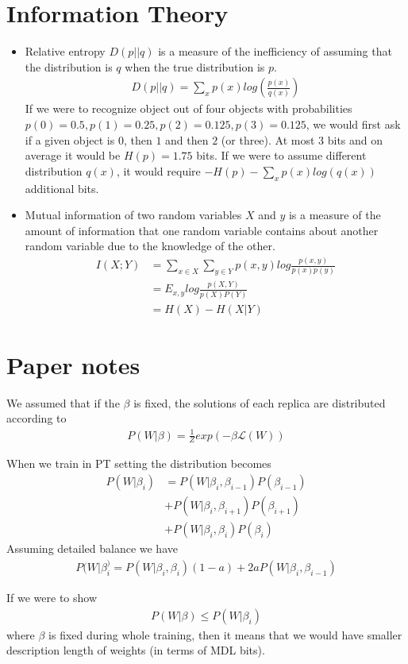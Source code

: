 \documentclass[class=article, crop=false]{standalone}
\numberwithin{equation}{section}
\begin{document}
\section{Information Theory}
\begin{itemize}
    \item Relative entropy $D(p||q)$ is a measure of the inefficiency of assuming that the distribution is $q$ when the true distribution is $p$.
    \begin{align}
        D(p||q)=\sum\limits_x p(x)log(\frac{p(x)}{q(x)})
    \end{align}
    If we were to recognize object out of four objects with probabilities $p(0)=0.5, p(1) = 0.25, p(2) = 0.125, p(3) = 0.125$, we would first ask if a given object is $0$, then $1$ and then $2$ (or three). At most 3 bits and on average it would be $H(p)=1.75$ bits. If we were to assume different distribution $q(x)$, it would require $-H(p) - \sum \limits_x p(x)log(q(x))$ additional bits.
    \item Mutual information of two random variables $X$ and $y$ is a measure of the amount of information that one random variable contains about another random variable due to the knowledge of the other. 
    \begin{align}
        I(X;Y)&=\sum\limits_{x\in X}\sum\limits_{y\in Y}p(x, y)log \frac{p(x, y)}{p(x)p(y)} \nonumber \\
        &=E_{x, y}log \frac{p(X, Y)}{p(X)P(Y)} \nonumber \\
        &= H(X)-H(X|Y)
    \end{align}
\end{itemize}

\section{Paper notes}
We assumed that if the $\beta$ is fixed, the solutions of each replica are distributed according to
\begin{align}
    P(W|\beta)=\frac{1}{Z}exp(-\beta \mathcal{L}(W))
\end{align}

When we train in PT setting the distribution becomes
\begin{align}
    P(W|\beta_i)&=P(W|\beta_i, \beta_{i-1})P(\beta_{i-1})\\
    &+P(W|\beta_i, \beta_{i+1})P(\beta_{i+1})\nonumber \\ 
    &+P(W|\beta_i, \beta_{i})P(\beta_{i})\nonumber
\end{align}
Assuming detailed balance we have
\begin{align}
    P(W|\beta_i^)=P(W|\beta_i, \beta_i)(1-a)+2aP(W|\beta_i, \beta_{i-1})
\end{align}

If we were to show
\begin{align}
    P(W|\beta)\leq P(W|\beta_i)
\end{align}
where $\beta$ is fixed during whole training, then it means that we would have smaller description length of weights (in terms of MDL bits).
\end{document}
